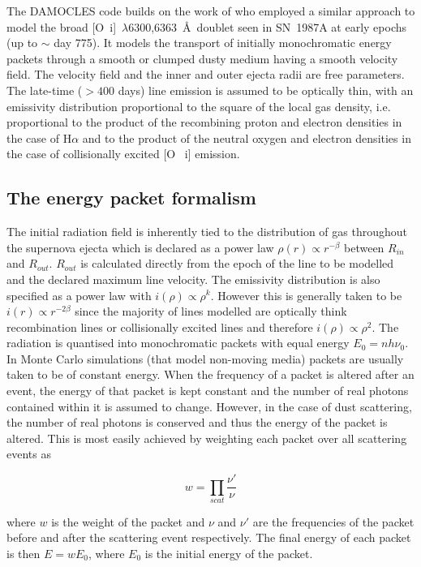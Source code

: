 \documentclass[useAMS,usenatbib,usegraphicx]{mnras}
\begin{document}
The DAMOCLES code builds on the work of \citet{Lucy1989} who employed a 
similar approach to model the broad [O~{\sc i}]~$\lambda$6300,6363~\AA\ doublet 
seen in SN~1987A at early epochs (up to $\sim$ day 775).  It models the 
transport of initially monochromatic energy packets through a smooth or 
clumped dusty medium having a smooth velocity field. The velocity field 
and the inner and outer ejecta radii are free parameters. The late-time 
($> 400$ days) line emission is assumed to be optically thin, with an 
emissivity distribution proportional to the square of the local gas density, i.e. 
proportional to the product of the recombining proton and electron 
densities in the case of H$\alpha$ and to the product of the neutral 
oxygen and electron densities in the case of collisionally excited [O~{\sc 
i}] emission.

\subsection{The energy packet formalism}
\label{packets}

The initial radiation field is inherently tied to the distribution of gas 
throughout the supernova ejecta which is declared as a power law $\rho(r) 
\propto r^{-\beta}$ between $R_{in}$ and $R_{out}$. $R_{out}$ is calculated directly from the epoch of the line to be modelled and the declared maximum line velocity.  The emissivity 
distribution is also specified as a power law with $i(\rho) \propto 
\rho^{k}$.  However this is generally taken to be $i(r) \propto r 
^{-2\beta}$ since the majority of lines modelled are optically think recombination lines or collisionally excited lines
and therefore $i(\rho) \propto \rho^2$.  The radiation is quantised into 
monochromatic packets with equal energy $E_{0}=nh\nu_{0}$.  In Monte Carlo 
simulations (that model non-moving media) packets are usually taken 
to be of constant energy.  When the frequency of a packet is altered after 
an event, the energy of that packet is kept constant and the number of 
real photons contained within it is assumed to change.  However, in the case 
of dust scattering, the number of real photons is conserved and thus the 
energy of the packet is altered.  This is most easily achieved by 
weighting each packet over all scattering events as 

\begin{equation}
w=\prod_{scat} \frac{\nu'}{\nu}
\end{equation} 

\noindent where $w$ is the weight of the packet and $\nu$ and $\nu'$ are the frequencies of the packet before and after the scattering event respectively.  The final 
energy of each packet is then $E=wE_0$, where $E_0$ is the initial energy 
of the packet.
\end{document}
